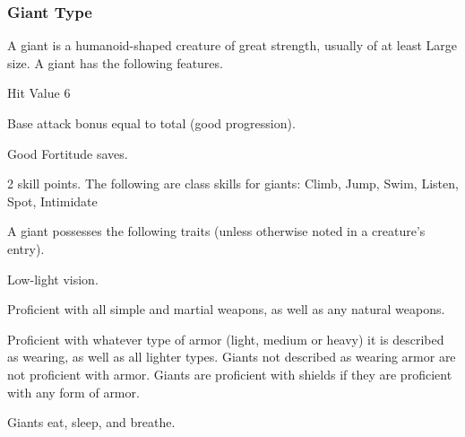 \subsubsection{Giant Type} A giant is a humanoid-shaped creature of great strength, usually of at least Large size.
 A giant has the following features.
\begin{itemize*}
\item Hit Value 6
\item Base attack bonus equal to total  (good progression).
\item Good Fortitude saves.
\item 2 skill points. The following are class skills for giants: Climb, Jump, Swim, Listen, Spot, Intimidate
\end{itemize*}
 A giant possesses the following traits (unless otherwise noted in a creature's entry).
\begin{itemize*}
\item Low-light vision.
\item Proficient with all simple and martial weapons, as well as any natural weapons.
\item Proficient with whatever type of armor (light, medium or heavy) it is described as wearing, as well as all lighter types. Giants not described as wearing armor are not proficient with armor. Giants are proficient with shields if they are proficient with any form of armor.
\item Giants eat, sleep, and breathe.
\end{itemize*}

